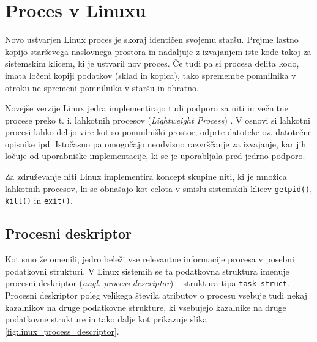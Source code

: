 \documentclass[a4paper,12pt,openright]{book}
\begin{document}
\section{Proces v Linuxu}

Novo ustvarjen Linux proces je skoraj identičen svojemu staršu.
Prejme lastno kopijo starševega naslovnega prostora in nadaljuje z izvajanjem iste kode takoj za sistemskim klicem, ki je ustvaril nov proces.
Če tudi pa si procesa delita kodo, imata ločeni kopiji podatkov (sklad in kopica), tako spremembe pomnilnika v otroku ne spremeni pomnilnika v staršu in obratno.

Novejše verzije Linux jedra implementirajo tudi podporo za niti in večnitne procese preko t. i. lahkotnih procesov (\textit{Lightweight Process}) \cite{Bovet_Cesati_2005}.
V osnovi si lahkotni procesi lahko delijo vire kot so pomnilniški prostor, odprte datoteke oz. datotečne opisnike ipd.
Istočasno pa omogočajo neodvisno razvrščanje za izvajanje, kar jih ločuje od uporabniške implementacije, ki se je uporabljala pred jedrno podporo.

Za združevanje niti Linux implementira koncept skupine niti, ki je množica lahkotnih procesov, ki se obnašajo kot celota v smislu sistemskih klicev \texttt{getpid()}, \texttt{kill()} in \texttt{exit()}.

\subsection{Procesni deskriptor}

Kot smo že omenili, jedro beleži vse relevantne informacije procesa v posebni podatkovni strukturi.
V Linux sistemih se ta podatkovna struktura imenuje procesni deskriptor (\textit{angl. process descriptor}) -- struktura tipa \texttt{task\_struct}.
Procesni deskriptor poleg velikega števila atributov o procesu vsebuje tudi nekaj kazalnikov na druge podatkovne strukture, ki vsebujejo kazalnike na druge podatkovne strukture in tako dalje kot prikazuje slika \ref{fig:linux_process_descriptor}.
\end{document}
